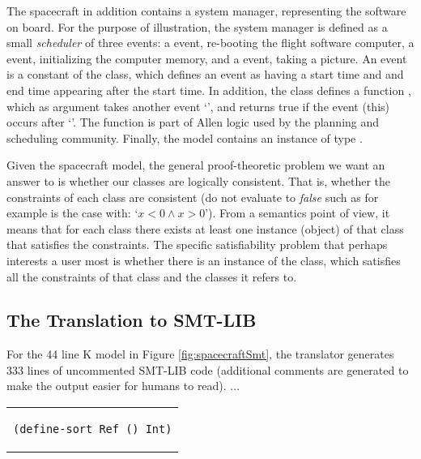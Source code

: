 The spacecraft in addition contains a system manager, representing
the software on board. For the purpose of illustration, the system manager is defined as a small {\em scheduler} of three events: 
a  event, re-booting the flight software computer, a  event, initializing the computer memory, and a 
 event, taking a picture. An event is a constant
of the  class, which defines an event as having a start time and and end time appearing after the start time. In addition, the  class defines a function ,
which as argument takes another event `', 
and returns true if the event (this) occurs after `'.
The  function is part of Allen logic 
\cite{allen-logic-84} used by the planning and scheduling community. 
%
Finally, the model contains an instance  of type
.

Given the spacecraft model, the general proof-theoretic
problem we want an answer to is whether our classes are logically consistent. That is, whether the constraints of each class are consistent (do not evaluate to {\em false} such as for example is
the case with: `$x < 0 \wedge x > 0$'). From a semantics point of view, it means that for each class there exists at least one instance (object) of that class that satisfies the constraints. 
The specific satisfiability problem that perhaps interests a
user most is whether there is an instance of the  class, which satisfies all the constraints of that class and the classes it refers to.

\subsection{The Translation to SMT-LIB}

\lstset{language=SMT}

For the 44 line K model in Figure \ref{fig:spacecraftSmt},
the translator generates 333 lines of uncommented SMT-LIB code (additional comments are generated to make the output easier for humans to read). ...

\hline

\begin{center}
\begin{tabular}{c}
\begin{lstlisting}
(define-sort Ref () Int)
\end{lstlisting}
\end{tabular}
\end{center}

